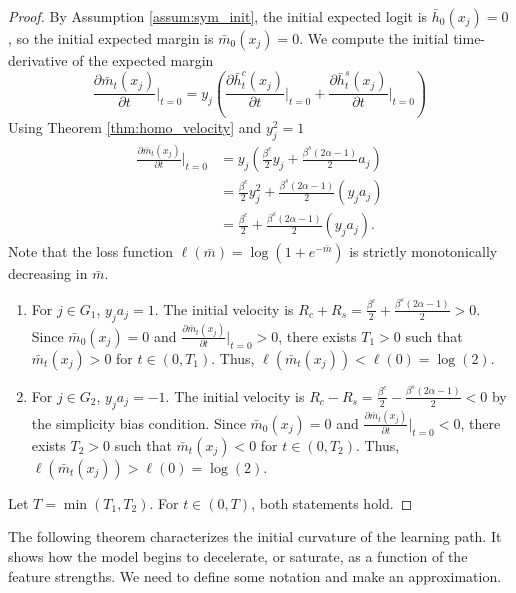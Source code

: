 \documentclass[letter,11pt]{article}
\begin{document}
\begin{proof}
By Assumption \ref{assum:sym_init}, the initial expected logit is $\bar{h}_0(x_j) = 0$, so the initial expected margin is $\bar{m}_0(x_j) = 0$. We compute the initial time-derivative of the expected margin
$$\frac{\partial \bar{m}_t(x_j)}{\partial t} \Big|_{t=0} = y_j \left( \frac{\partial \bar{h}_t^c(x_j)}{\partial t} \Big|_{t=0} + \frac{\partial \bar{h}_t^s(x_j)}{\partial t} \Big|_{t=0} \right)$$
Using Theorem \ref{thm:homo_velocity} and $y_j^2=1$
\begin{equation}
\begin{aligned}
\frac{\partial \bar{m}_t(x_j)}{\partial t} \Big|_{t=0}
    &= y_j \left( \frac{\beta^c}{2} y_j + \frac{\beta^s (2\alpha - 1)}{2} a_j \right) \\
    &= \frac{\beta^c}{2} y_j^2 + \frac{\beta^s (2\alpha - 1)}{2} (y_j a_j) \\
    &= \frac{\beta^c}{2} + \frac{\beta^s (2\alpha - 1)}{2} (y_j a_j).
\end{aligned}
\end{equation}
Note that the loss function $\ell(\bar{m}) = \log(1 + e^{-\bar{m}})$ is strictly monotonically decreasing in $\bar{m}$.
\begin{enumerate}
    \item For $j \in G_1$, $y_j a_j = 1$. The initial velocity is $R_c + R_s = \frac{\beta^c}{2} + \frac{\beta^s(2\alpha-1)}{2} > 0$. Since $\bar{m}_0(x_j) = 0$ and $\frac{\partial \bar{m}_t(x_j)}{\partial t} \Big|_{t=0} > 0$, there exists $T_1 > 0$ such that $\bar{m}_t(x_j) > 0$ for $t \in (0, T_1)$. Thus, $\ell(\bar{m}_t(x_j)) < \ell(0) = \log(2)$.
    \item For $j \in G_2$, $y_j a_j = -1$. The initial velocity is $R_c - R_s = \frac{\beta^c}{2} - \frac{\beta^s(2\alpha-1)}{2} < 0$ by the simplicity bias condition. Since $\bar{m}_0(x_j) = 0$ and $\frac{\partial \bar{m}_t(x_j)}{\partial t} \Big|_{t=0} < 0$, there exists $T_2 > 0$ such that $\bar{m}_t(x_j) < 0$ for $t \in (0, T_2)$. Thus, $\ell(\bar{m}_t(x_j)) > \ell(0) = \log(2)$.
\end{enumerate}
Let $T = \min(T_1, T_2)$. For $t \in (0, T)$, both statements hold.
\end{proof}

The following theorem characterizes the initial curvature of the learning path. It shows how the model begins to decelerate, or saturate, as a function of the feature strengths. We need to define some notation and make an approximation.
\end{document}
